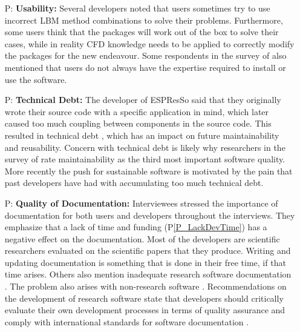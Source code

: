 \documentclass[final, 3p, times, authoryear]{elsarticle}
\newcounter{pnum} %
\newcommand{\ppref}[1]{P\ref{#1}}
\begin{document}
\begin{enumerate}
	\item[P\refstepcounter{pnum}\thepnum \label{P_Usability}:]
	\textbf{Usability:} Several developers noted that users sometimes try to use
	incorrect LBM method combinations to solve their problems. Furthermore, some
	users think that the packages will work out of the box to solve their cases,
	while in reality CFD knowledge needs to be applied to correctly modify the
	packages for the new endeavour.  Some respondents in the survey of
	\citet{WieseEtAl2019} also mentioned that users do not always have the
	expertise required to install or use the software.

	\item[P\refstepcounter{pnum}\thepnum \label{P_TechDebt}:] \textbf{Technical
	Debt:} The developer of ESPResSo said that they originally wrote their source
	code with a specific application in mind, which later caused too much
	coupling between components in the source code. This resulted in technical
	debt \citep{KruchtenEtAl2012}, which has an impact on future maintainability
	and reusability. Concern with technical debt is likely why researchers in
	the survey of \citet{Nguyen-HoanEtAl2010} rate maintainability as the third
	most important software quality. More recently the push for sustainable
	software \citep{deSouzaEtAl2019} is motivated by the pain that past
	developers have had with accumulating too much technical debt.

	\item[P\refstepcounter{pnum}\thepnum \label{P_Documentation}:]
	\textbf{Quality of Documentation:}  Interviewees stressed the importance of
	documentation for both users and developers throughout the interviews. They
	emphasize that a lack of time and funding (\ppref{P_LackDevTime}) has a
	negative effect on the documentation. Most of the developers are scientific
	researchers evaluated on the scientific papers that they produce. Writing
	and updating documentation is something that is done in their free time, if
	that time arises. Others also mention inadequate research software
	documentation \citep{PintoEtAl2018, WieseEtAl2019}.  The problem also arises
	with non-research software \citep{LethbridgeEtAl2003}. Recommendations on
	the development of research software state that developers should critically
	evaluate their own development processes in terms of quality assurance and
	comply with international standards for software documentation
	\citep{KaterbowAndFeulner2018}.

\end{enumerate}
\end{document}
